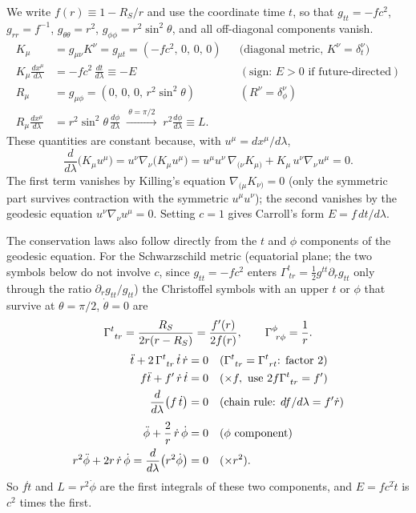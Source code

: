 \begin{derivation}
We write $f(r) \equiv 1 - R_S/r$ and use the coordinate time $t$, so
that $g_{tt} = -fc^2$, $g_{rr} = f^{-1}$, $g_{\theta\theta} = r^2$,
$g_{\phi\phi} = r^2\sin^2\theta$, and all off-diagonal components vanish.
\begin{align*}
K_\mu &= g_{\mu\nu}K^\nu = g_{\mu t} = (-fc^2,\,0,\,0,\,0)
  && \text{(diagonal metric, } K^\nu = \delta^\nu_t\text{)} \\
K_\mu \frac{dx^\mu}{d\lambda} &= -fc^2\,\frac{dt}{d\lambda} \equiv -E
  && (\text{sign: } E > 0 \text{ if future-directed}) \\
R_\mu &= g_{\mu\phi} = (0,\,0,\,0,\,r^2\sin^2\theta)
  && (R^\nu = \delta^\nu_\phi) \\
R_\mu \frac{dx^\mu}{d\lambda} &= r^2\sin^2\theta\,\frac{d\phi}{d\lambda}
  \;\xrightarrow{\ \theta = \pi/2\ }\; r^2\frac{d\phi}{d\lambda} \equiv L .
\end{align*}
These quantities are constant because, with $u^\mu = dx^\mu/d\lambda$,
\[
\frac{d}{d\lambda}\bigl(K_\mu u^\mu\bigr)
= u^\nu\nabla_\nu\bigl(K_\mu u^\mu\bigr)
= u^\mu u^\nu\,\nabla_{(\nu}K_{\mu)} + K_\mu\,u^\nu\nabla_\nu u^\mu = 0 .
\]
The first term vanishes by Killing's equation $\nabla_{(\mu}K_{\nu)} = 0$
(only the symmetric part survives contraction with the symmetric
$u^\mu u^\nu$); the second vanishes by the geodesic equation
$u^\nu\nabla_\nu u^\mu = 0$.  Setting $c = 1$ gives Carroll's form
$E = f\,dt/d\lambda$.
\end{derivation}

\begin{derivation}
The conservation laws also follow directly from the $t$ and $\phi$
components of the geodesic equation.  For the Schwarzschild metric
(equatorial plane; the two symbols below do not involve $c$, since
$g_{tt} = -fc^2$ enters $\Gamma^t_{\ tr} = \tfrac12 g^{tt}\partial_r g_{tt}$
only through the ratio $\partial_r g_{tt}/g_{tt}$) the Christoffel symbols
with an upper $t$ or $\phi$ that survive at $\theta = \pi/2$,
$\dot\theta = 0$ are
\[
\Gamma^{t}_{\ t r} = \frac{R_S}{2r(r - R_S)} = \frac{f'(r)}{2f(r)} ,
\qquad
\Gamma^{\phi}_{\ r \phi} = \frac{1}{r} .
\]
\begin{align*}
\ddot t + 2\,\Gamma^{t}_{\ t r}\,\dot t\,\dot r &= 0
  && (\Gamma^t_{\ tr} = \Gamma^t_{\ rt}\text{: factor 2}) \\
f\ddot t + f'\,\dot r\,\dot t &= 0
  && (\times f,\ \text{use } 2f\Gamma^t_{\ tr} = f') \\
\frac{d}{d\lambda}\bigl(f\,\dot t\bigr) &= 0
  && (\text{chain rule: } df/d\lambda = f'\dot r) \\[4pt]
\ddot\phi + \frac{2}{r}\,\dot r\,\dot\phi &= 0
  && (\phi \text{ component}) \\
r^2\ddot\phi + 2r\,\dot r\,\dot\phi = \frac{d}{d\lambda}\bigl(r^2\dot\phi\bigr) &= 0
  && (\times r^2) .
\end{align*}
So $f\dot t$ and $L = r^2\dot\phi$ are the first integrals of these
two components, and $E = fc^2\dot t$ is $c^2$ times the first.
\end{derivation}


